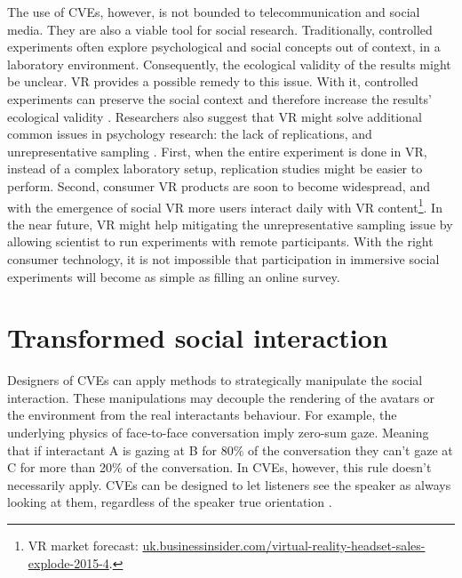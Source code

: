 \documentclass[]{simple-thesis}
\begin{document}
The use of CVEs, however, is not bounded to telecommunication and social media.
They are also a viable tool for social research.
Traditionally, controlled experiments often explore psychological and social concepts out of context, in a laboratory environment.
Consequently, the ecological validity of the results might be unclear.
VR provides a possible remedy to this issue.
With it, controlled experiments can preserve the social context and therefore increase the results' ecological validity \citep{Loomis1999}.
Researchers also suggest that VR might solve additional common issues in psychology research: the lack of replications, and unrepresentative sampling \citep{Blascovich2002}.
First, when the entire experiment is done in VR, instead of a complex laboratory setup, replication studies might be easier to perform.
Second, consumer VR products are soon to become widespread, and with the emergence of social VR more users interact daily with VR content\footnote{VR market forecast: \href{http://uk.businessinsider.com/virtual-reality-headset-sales-explode-2015-4}{uk.businessinsider.com/virtual-reality-headset-sales-explode-2015-4}.}.
In the near future, VR might help mitigating the unrepresentative sampling issue by allowing scientist to run experiments with remote participants.
With the right consumer technology, it is not impossible that participation in immersive social experiments will become as simple as filling an online survey.

\section{Transformed social interaction}

Designers of CVEs can apply methods to strategically manipulate the social interaction.
These manipulations may decouple the rendering of the avatars or the environment from the real interactants behaviour.
For example, the underlying physics of face-to-face conversation imply zero-sum gaze.
Meaning that if interactant A is gazing at B for 80\% of the conversation they can't gaze at C for more than 20\% of the conversation.
In CVEs, however, this rule doesn't necessarily apply.
CVEs can be designed to let listeners see the speaker as always looking at them, regardless of the speaker true orientation \citep{Beall2003}.
\end{document}
